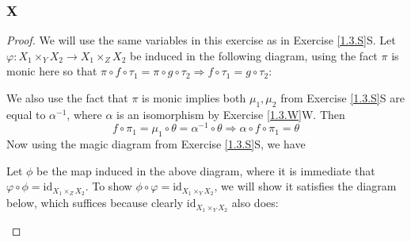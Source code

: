 \documentclass{article}
\newcommand{\id}{\mathrm{id}}
\begin{document}
\subsubsection{X}\label{1.3.X}
\begin{proof}
    We will use the same variables in this exercise as in Exercise \ref{1.3.S}S. Let $\varphi:X_1\times_YX_2\to X_1\times_ZX_2$ be induced in the following diagram, using the fact $\pi$ is monic here so that $\pi\circ f \circ \tau_1=\pi\circ g \circ \tau_2\Rightarrow f\circ \tau_1=g\circ \tau_2$:
    \begin{center}
    \end{center}
    We also use the fact that $\pi$ is monic implies both $\mu_1,\mu_2$ from Exercise \ref{1.3.S}S are equal to $\alpha^{-1}$, where $\alpha$ is an isomorphism by Exercise \ref{1.3.W}W. Then
    \[
    f\circ \pi_1=\mu_1\circ \theta=\alpha^{-1}\circ \theta\Rightarrow \alpha\circ f\circ \pi_1=\theta
    \]
    Now using the magic diagram from Exercise \ref{1.3.S}S, we have
    \begin{center}
    \end{center}
    Let $\phi$ be the map induced in the above diagram, where it is immediate that $\varphi\circ \phi=\id_{X_1\times_Z X_2}$. To show $\phi\circ \varphi=\id_{X_1\times_Y X_2}$, we will show it satisfies the diagram below, which suffices because clearly $\id_{X_1\times_Y X_2}$ also does:
    \begin{center}
        \begin{tikzcd}

\end{tikzcd}
\end{center}
\end{proof}
\end{document}
